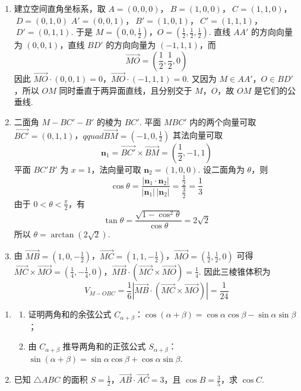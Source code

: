 \begin{solution}
\begin{enumerate}
\item 建立空间直角坐标系，取
\(A=(0,0,0)\)，\(\ B=(1,0,0)\)，\(\ C=(1,1,0)\)，\(\ D=(0,1,0)\)
\(A'=(0,0,1)\)，\(\ B'=(1,0,1)\)，\(\ C'=(1,1,1)\)，\(\ D'=(0,1,1)\).
于是
\(M=\left(0,0,\frac12\right)\)，\(O=\left(\frac12,\frac12,\frac12\right)\).
直线 \(AA'\) 的方向向量为 \((0,0,1)\)，直线 \(BD'\) 的方向向量为 \((-1,1,1)\)，而
\[
\overrightarrow{MO}=\left(\frac12,\frac12,0\right)
\]
因此
\(\overrightarrow{MO}\cdot(0,0,1)=0\)，\(\overrightarrow{MO}\cdot(-1,1,1)=0\).
又因为 \(M\in AA'\)，\(O\in BD'\)，所以 \(OM\) 同时垂直于两异面直线，且分别交于 \(M\)，\(O\)，故 \(OM\) 是它们的公垂线.

\item 二面角 \(M-BC'-B'\) 的棱为 \(BC'\). 平面 \(MBC'\) 内的两个向量可取
\(\overrightarrow{BC'}=(0,1,1)\)，\(qquad \overrightarrow{BM}=\left(-1,0,\frac12\right)\)
其法向量可取
\[
\mathbf n_1=\overrightarrow{BC'}\times\overrightarrow{BM}=\left(\frac12,-1,1\right)
\]
平面 \(BC'B'\) 为 \(x=1\)，法向量可取 \(\mathbf n_2=(1,0,0)\). 设二面角为 \(\theta\)，则
\[
\cos\theta=\frac{|\mathbf n_1\cdot\mathbf n_2|}{|\mathbf n_1|\,|\mathbf n_2|}
=\frac{\frac{1}{2}}{\frac{3}{2}}=\frac13
\]
由于 \(0<\theta<\frac\pi2\)，有
\[
\tan\theta=\frac{\sqrt{1-\cos^2\theta}}{\cos\theta}=2\sqrt2
\]
所以 \(\theta=\arctan(2\sqrt2)\).

\item 由
\(\overrightarrow{MB}=\left(1,0,-\frac12\right)\)，\(\overrightarrow{MC}=\left(1,1,-\frac12\right)\)，\(\overrightarrow{MO}=\left(\frac12,\frac12,0\right)\)
可得
\(\overrightarrow{MC}\times\overrightarrow{MO}=\left(\frac14,-\frac14,0\right)\)，\(\overrightarrow{MB}\cdot(\overrightarrow{MC}\times\overrightarrow{MO})=\frac14\).
因此三棱锥体积为
\[
V_{M-OBC}=\frac16\left|\overrightarrow{MB}\cdot(\overrightarrow{MC}\times\overrightarrow{MO})\right|=\frac1{24}
\]
\end{enumerate}
\end{solution}

\begin{problem}
\begin{enumerate}
\item
\begin{enumerate}
\item 证明两角和的余弦公式 \(C_{\alpha+\beta}\)：\(\cos (\alpha + \beta) = \cos \alpha \cos \beta - \sin \alpha \sin \beta\)；
\item 由 \(C_{\alpha+\beta}\) 推导两角和的正弦公式 \(S_{\alpha+\beta}\)：\(\sin (\alpha + \beta) = \sin \alpha \cos \beta + \cos \alpha \sin \beta\).
\end{enumerate}
\item 已知 \(\triangle ABC\) 的面积 \(S = \frac{1}{2}\)，\(\overrightarrow{AB} \cdot \overrightarrow{AC} = 3\)，且 \(\cos B = \frac{3}{5}\)，求 \(\cos C\).
\end{enumerate}
\end{problem}


